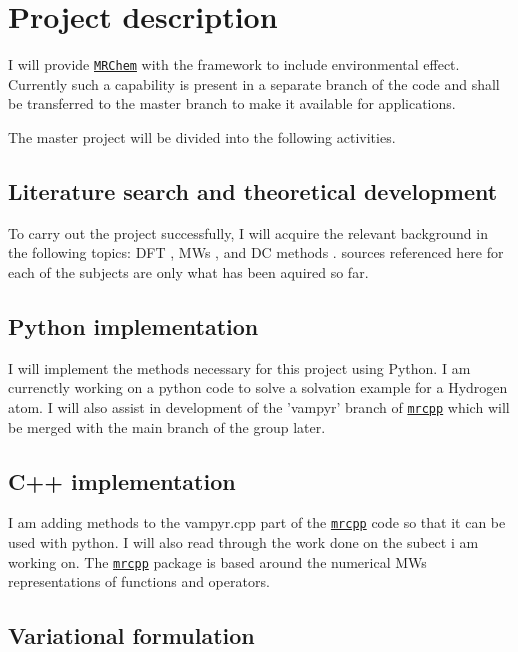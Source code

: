 \documentclass[a4paper,11pt]{article}
\newcommand{\mrchem}{\href{https://mrchem.readthedocs.io/en/latest/}{\texttt{MRChem}}}
\newcommand{\mrcpp}{\href{https://mrcpp.readthedocs.io/en/latest/}{\texttt{mrcpp}}}
\begin{document}
\section{Project description}

I will provide \mrchem{} with the
framework to include environmental effect. Currently such a capability
is present in a separate branch of the code and shall be transferred
to the master branch to make it available for applications.

The master project will be divided into the following activities.

\subsection{Literature search and theoretical development}

To carry out the project successfully, I will acquire the relevant
background in the following topics: \acl{DFT} \cite{Jensen:2017}, \aclp{MW} \cite{Frediani:2013} \cite{FossoTande:2013ka}  \cite{Beylkin1999AdaptiveSO} , and \acl{DC} 
methods \cite{FossoTande:2013ka} \cite{Lipparini:2010bg}.
sources referenced here for each of the subjects are only what has been aquired so far.

\subsection{Python implementation}

I will implement the methods necessary for this project using Python.
I am currenctly working on a python code to solve a solvation example
for a Hydrogen atom. I will also assist in development of the 'vampyr'
branch of \mrcpp{} which will be merged with the main branch of the group
later.

\subsection{C++ implementation}
I am adding methods to the vampyr.cpp part of the \mrcpp{} code so
that it can be used with python. I will also read through the work
done on the subect i am working on. The \mrcpp{} package is based
around the numerical \aclp{MW} representations of functions and
operators.

\subsection{Variational formulation}
\end{document}
